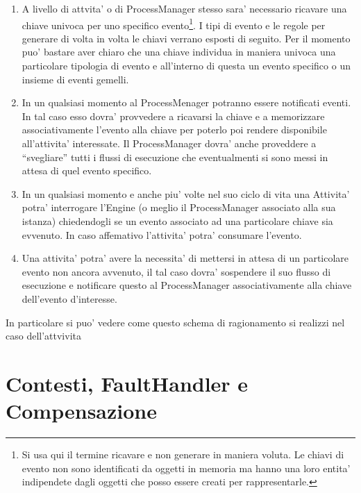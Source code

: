 \begin{enumerate}
  \item A livello di attvita' o di ProcessManager stesso
  sara' necessario ricavare una chiave univoca per uno specifico 
  evento\footnote{Si usa qui il termine ricavare e non generare in maniera
  voluta. Le chiavi di evento non sono identificati da oggetti in memoria ma hanno una loro entita' indipendete
  dagli oggetti che posso essere creati per rappresentarle.}.
  I tipi di evento e le regole per generare di volta in volta 
  le chiavi verrano esposti di seguito. Per il momento puo' bastare aver 
  chiaro che una chiave individua in maniera univoca una particolare 
  tipologia di evento e all'interno di questa un evento specifico o un insieme
  di eventi gemelli. 
  
  \item In un qualsiasi momento al ProcessMenager potranno essere notificati
  eventi. In tal caso esso dovra' provvedere a ricavarsi la chiave e a
  memorizzare associativamente l'evento alla chiave per poterlo poi rendere
  disponibile all'attivita' interessate. Il ProcessManager dovra' anche
  proveddere a ``svegliare'' tutti i flussi di esecuzione che
  eventualmenti si sono messi in attesa di quel evento specifico.
   
  \item In un qualsiasi momento e anche piu' volte nel suo ciclo di vita una
  Attivita' potra' interrogare l'Engine (o meglio il ProcessManager associato
  alla sua istanza) chiedendogli se un evento associato ad una particolare
  chiave sia evvenuto. In caso affemativo l'attivita' potra' consumare l'evento.

  \item Una attivita' potra' avere la necessita' di mettersi in attesa di un
  particolare evento non ancora avvenuto, il tal caso dovra' sospendere il
  suo flusso di esecuzione e notificare questo al ProcessManager
  associativamente alla chiave dell'evento d'interesse. 
\end{enumerate}

In particolare si puo' vedere come questo schema di ragionamento si realizzi
nel caso dell'attvivita 

\section{Contesti, FaultHandler e Compensazione}



